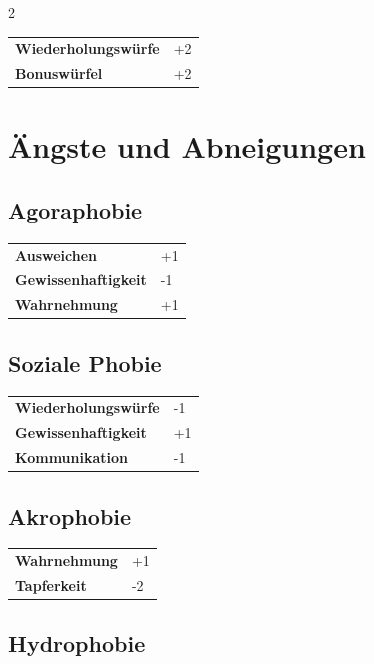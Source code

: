 \begin{multicols}{2}
    \begin{tabular}{@{}ll@{}}
        \textbf{Wiederholungswürfe} & +2\\
        \textbf{Bonuswürfel} & +2\\
    \end{tabular}

    \section{Ängste und Abneigungen}

    \subsection*{Agoraphobie}




    \begin{tabular}{@{}ll@{}}
        \textbf{Ausweichen} & +1\\
        \textbf{Gewissenhaftigkeit} & -1\\
        \textbf{Wahrnehmung} & +1\\
    \end{tabular}

    \subsection*{Soziale Phobie}




    \begin{tabular}{@{}ll@{}}
        \textbf{Wiederholungswürfe} & -1\\
        \textbf{Gewissenhaftigkeit} & +1\\
        \textbf{Kommunikation} & -1\\
    \end{tabular}

    \subsection*{Akrophobie}




    \begin{tabular}{@{}ll@{}}
        \textbf{Wahrnehmung} & +1\\
        \textbf{Tapferkeit} & -2\\
    \end{tabular}

    \subsection*{Hydrophobie}





\end{multicols}
